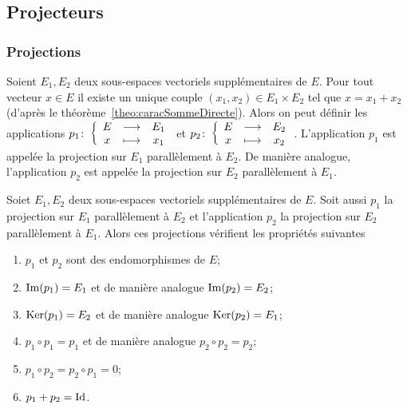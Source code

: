 \subsection{Projecteurs}

\subsubsection{Projections}
\label{sec:projections}

\begin{defdef}
  Soient \(E_1, E_2\) deux sous-espaces vectoriels supplémentaires de \(E\). Pour tout vecteur \(x \in E\) il existe un unique couple \((x_1,x_2) \in E_1 \times E_2\) tel que \(x=x_1+x_2\) (d'après le théorème~\ref{theo:caracSommeDirecte}). Alors on peut définir les applications \(p_1\colon \left\{\begin{array}{ccc} E & \longrightarrow &E_1\\ x & \longmapsto & x_1 \end{array} \right.\) et \(p_2\colon \left\{\begin{array}{ccc} E & \longrightarrow &E_2\\ x & \longmapsto & x_2 \end{array} \right.\). L'application \(p_1\) est appelée la projection sur \(E_1\) parallèlement à \(E_2\). De manière analogue, l'application \(p_2\) est appelée la projection sur \(E_2\) parallèlement à \(E_1\).
\end{defdef}

\begin{theo}\label{theo:propprojection}
  Soiet \(E_1, E_2\) deux sous-espaces vectoriels supplémentaires de \(E\). Soit aussi \(p_1\) la projection sur \(E_1\) parallèlement à \(E_2\) et l'application \(p_2\) la projection sur \(E_2\) parallèlement à \(E_1\). Alors ces projections vérifient les propriétés suivantes
  \begin{enumerate}
  \item \(p_1\) et \(p_2\) sont des endomorphismes de \(E\);
  \item \(\operatorname{Im}(p_1)=E_1\) et de manière analogue \(\operatorname{Im}(p_2)=E_2\);
  \item \(\operatorname{Ker}(p_1)=E_2\) et de manière analogue \(\operatorname{Ker}(p_2)=E_1\);
  \item \(p_1 \circ p_1=p_1\) et de manière analogue \(p_2 \circ p_2=p_2\);
  \item \(p_1 \circ p_2 = p_2 \circ p_1=0\);
  \item \(p_1+p_2=\operatorname{Id}\).
  \end{enumerate}
\end{theo}

